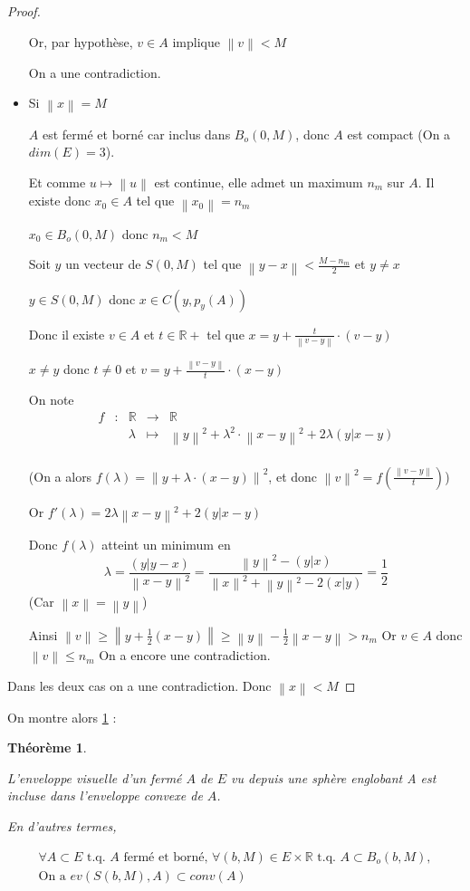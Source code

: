 \documentclass[a4paper]{article}
\newcommand{\norm}[1]{\left\lVert#1\right\rVert}
\newtheorem{theo}{Théorème}
\begin{document}
\begin{proof}
\begin{itemize}
Or, par hypothèse, $v \in A$ implique $\norm{v} < M$

On a une contradiction.

\item Si  $\norm{x} = M$

$A$ est fermé et borné car inclus dans $B_{o}(0, M)$, donc $A$ est compact (On a $dim(E) = 3$).

Et comme $u \mapsto \norm{u}$ est continue, elle admet un maximum $n_{m}$ sur $A$. Il existe donc $x_{0} \in A$ tel que $\norm{x_{0}} = n_{m}$

$x_{0} \in B_{o}(0, M)$ donc $n_{m} < M$

Soit $y$ un vecteur de $S(0, M)$ tel que $\norm{y - x} < \frac{M - n_{m}}{2}$ et $y \neq x$

$y \in S(0, M)$ donc $x \in C(y, p_{y}(A))$

Donc il existe $v \in A$ et $t \in \mathbb{R}+$ tel que $x = y + \frac{t}{\norm{v - y}} \cdot (v - y)$

$x \neq y$ donc $t \neq 0$ et $v = y + \frac{\norm{v - y}}{t} \cdot (x - y)$

On note 
\[\begin{array}{ccccl}
f & : & \mathbb{R} & \to & \mathbb{R} \\
 & & \lambda & \mapsto & \norm{y}^{2} + \lambda^{2} \cdot \norm{x - y}^{2} + 2 \lambda (y|x - y)\\
\end{array}\]

(On a alors $f(\lambda) = \norm{y + \lambda \cdot (x - y)}^{2}$, et donc $\norm{v}^{2} = f(\frac{\norm{v - y}}{t})$)

Or $f'(\lambda) = 2 \lambda \norm{x - y}^{2} + 2(y|x - y)$

Donc $f(\lambda)$ atteint un minimum en \[\lambda = \frac{(y|y - x)}{\norm{x - y}^2} = \frac{\norm{y}^{2} - (y|x)}{\norm{x}^{2} + \norm{y}^{2} - 2 (x|y)} = \frac{1}{2}\] (Car $\norm{x} = \norm{y}$)

Ainsi $\norm{v} \geqslant \norm{y + \frac{1}{2} (x - y)} \geqslant \norm{y} - \frac{1}{2} \norm{x - y} > n_{m}$
Or $v \in A$  donc $\norm{v} \leqslant n_{m}$
On a encore une contradiction.
\end{itemize}
Dans les deux cas on a une contradiction.
Donc $\norm{x} < M$
\end{proof}


On montre alors \ref{th1} :

\begin{theo}\label{th1}

L'enveloppe visuelle d'un fermé $A$ de $E$ vu depuis une sphère englobant A est incluse dans l'enveloppe convexe de $A$.

En d'autres termes, 

\begin{gather*}
\forall A \subset E \text{ t.q. $A$ fermé et borné, } \forall (b, M) \in E \times \mathbb{R} \text{ t.q. } A \subset B_{o}(b, M), \\
\text{On a } ev(S(b, M), A) \subset conv(A)
\end{gather*}
\end{theo}
\end{document}
